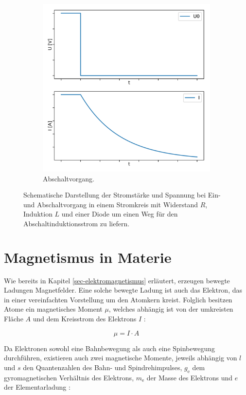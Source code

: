 \documentclass[page,pdftex,12pt,a4paper,twoside,openright]{scrbook}
\begin{document}
\begin{figure}
\begin{subfigure}[b]{0.49\textwidth}
\centering
\includegraphics[width=\textwidth]{./img/ausschalten.png}
\caption{Abschaltvorgang.}
\label{fig-abschalten}
\end{subfigure}
\caption{Schematische Darstellung der Stromstärke und Spannung bei Ein- und Abschaltvorgang in einem Stromkreis mit Widerstand $R$, Induktion $L$ und einer Diode um einen Weg für den Abschaltinduktionsstrom zu liefern.}
\end{figure}

\section{Magnetismus in Materie \label{sec-magnetismus}}
\label{sec:org9c95896}
Wie bereits in Kapitel \ref{sec-elektromagnetismus} erläutert, erzeugen bewegte Ladungen Magnetfelder. Eine solche bewegte Ladung ist auch das Elektron, das in einer vereinfachten Vorstellung um den Atomkern kreist. Folglich besitzen Atome ein magnetisches Moment \(\mu\), welches abhängig ist von der umkreisten Fläche \(A\) und dem Kreisstrom des Elektrons \(I\) \cite{kassing_bergmann_2005}:

\begin{equation}
\label{eq-moment:}
\mu = I \cdot A
\end{equation}

Da Elektronen sowohl eine Bahnbewegung als auch eine Spinbewegung durchführen, existieren auch zwei magnetische Momente, jeweils abhängig von \(l\) und \(s\) den Quantenzahlen des Bahn- und Spindrehimpulses, \(g_\mathrm{e}\) dem gyromagnetischen Verhältnis des Elektrons, \(m_\mathrm{e}\) der Masse des Elektrons und \(e\) der Elementarladung \cite{kassing_bergmann_2005}:
\end{document}
